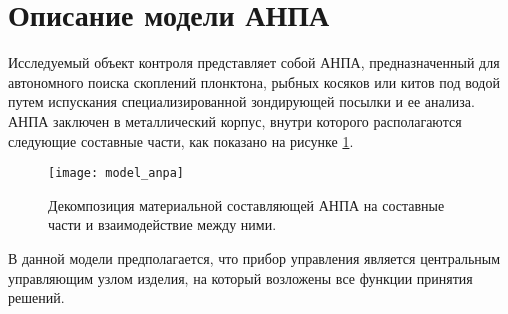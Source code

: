 \section{Описание модели АНПА} \label{sec:model_anpa}

Исследуемый объект контроля представляет собой АНПА, предназначенный для автономного поиска скоплений плонктона,
рыбных косяков или китов под водой путем испускания специализированной зондирующей посылки и ее анализа.
АНПА заключен в металлический корпус, внутри которого располагаются следующие составные части,
как показано на рисунке \ref{fig:model_anpa}.
\begin{center}
    \begin{figure}
        \texttt{[image: model\_anpa]}
        \caption{Декомпозиция материальной составляющей АНПА на составные части и взаимодействие между ними.}
            \label{fig:model_anpa}
    \end{figure}
\end{center}
В данной модели предполагается, что прибор управления является центральным управляющим узлом изделия,
на который возложены все функции принятия решений.

